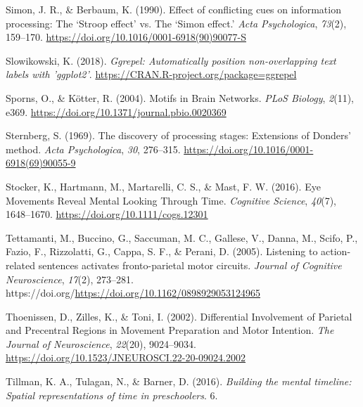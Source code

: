 \documentclass[
  a4paper,12pt,twoside,onecolumn,openright,final,oldfontcommands]{memoir}
\newlength{\cslhangindent}
\newlength{\cslentryspacingunit} %
\newenvironment{CSLReferences}[2] %
 {%
  \setlength{\parindent}{0pt}
  \ifodd #1
  \let\oldpar\par
  \def\par{\hangindent=\cslhangindent\oldpar}
  \fi
  \setlength{\parskip}{#2\cslentryspacingunit}
 }%
 {}
\begin{document}
\begin{CSLReferences}{1}{0}
\leavevmode{}%
Simon, J. R., \& Berbaum, K. (1990). Effect of conflicting cues on information processing: {The} {`{Stroop} effect'} vs. The {`{Simon} effect.'} \emph{Acta Psychologica}, \emph{73}(2), 159--170. \url{https://doi.org/10.1016/0001-6918(90)90077-S}

\leavevmode{}%
Slowikowski, K. (2018). \emph{Ggrepel: Automatically position non-overlapping text labels with 'ggplot2'}. \url{https://CRAN.R-project.org/package=ggrepel}

\leavevmode{}%
Sporns, O., \& Kötter, R. (2004). Motifs in {Brain} {Networks}. \emph{PLoS Biology}, \emph{2}(11), e369. \url{https://doi.org/10.1371/journal.pbio.0020369}

\leavevmode{}%
Sternberg, S. (1969). The discovery of processing stages: {Extensions} of {Donders}' method. \emph{Acta Psychologica}, \emph{30}, 276--315. \url{https://doi.org/10.1016/0001-6918(69)90055-9}

\leavevmode{}%
Stocker, K., Hartmann, M., Martarelli, C. S., \& Mast, F. W. (2016). Eye {Movements} {Reveal} {Mental} {Looking} {Through} {Time}. \emph{Cognitive Science}, \emph{40}(7), 1648--1670. \url{https://doi.org/10.1111/cogs.12301}

\leavevmode{}%
Tettamanti, M., Buccino, G., Saccuman, M. C., Gallese, V., Danna, M., Scifo, P., Fazio, F., Rizzolatti, G., Cappa, S. F., \& Perani, D. (2005). Listening to action-related sentences activates fronto-parietal motor circuits. \emph{Journal of Cognitive Neuroscience}, \emph{17}(2), 273--281. https://doi.org/\url{https://doi.org/10.1162/0898929053124965}

\leavevmode{}%
Thoenissen, D., Zilles, K., \& Toni, I. (2002). Differential {Involvement} of {Parietal} and {Precentral} {Regions} in {Movement} {Preparation} and {Motor} {Intention}. \emph{The Journal of Neuroscience}, \emph{22}(20), 9024--9034. \url{https://doi.org/10.1523/JNEUROSCI.22-20-09024.2002}

\leavevmode{}%
Tillman, K. A., Tulagan, N., \& Barner, D. (2016). \emph{Building the mental timeline: {Spatial} representations of time in preschoolers}. 6.


\end{CSLReferences}
\end{document}
